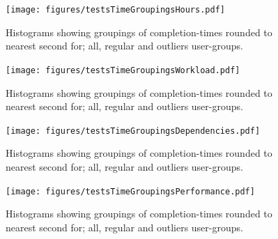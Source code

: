 \documentclass[nofilelist,dvipsnames]{cslthse-msc}
\begin{document}
        \begin{figure}[h!]
          \centering
          \texttt{[image: figures/testsTimeGroupingsHours.pdf]}
          \caption{
            Histograms showing groupings of completion-times rounded to nearest
            second for; all, regular and outliers user-groups.
          }
        \end{figure}

        \begin{figure}[h!]
          \centering
          \texttt{[image: figures/testsTimeGroupingsWorkload.pdf]}
          \caption{
            Histograms showing groupings of completion-times rounded to nearest
            second for; all, regular and outliers user-groups.
          }
        \end{figure}

        \begin{figure}[h!]
          \centering
          \texttt{[image: figures/testsTimeGroupingsDependencies.pdf]}
          \caption{
            Histograms showing groupings of completion-times rounded to nearest
            second for; all, regular and outliers user-groups.
          }
        \end{figure}

        \begin{figure}[h!]
          \centering
          \texttt{[image: figures/testsTimeGroupingsPerformance.pdf]}
          \caption{
            Histograms showing groupings of completion-times rounded to nearest
            second for; all, regular and outliers user-groups.
          }
        \end{figure}
\end{document}
